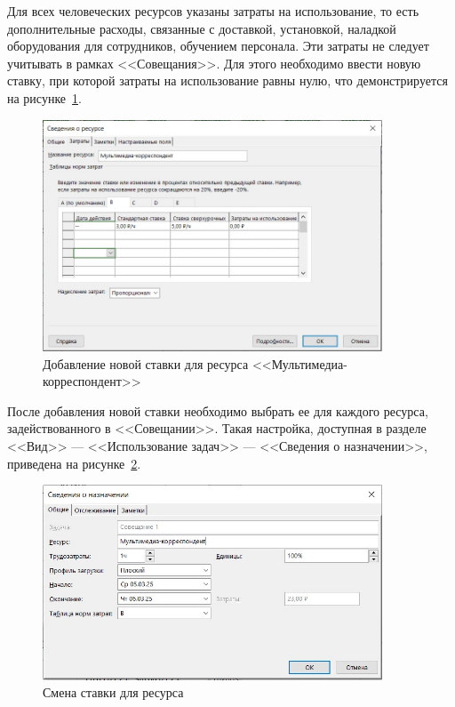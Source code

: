 Для всех человеческих ресурсов указаны затраты на использование, то есть дополнительные расходы, связанные с доставкой, установкой, наладкой оборудования для сотрудников, обучением персонала.
Эти затраты не следует учитывать в рамках <<Совещания>>.
Для этого необходимо ввести новую ставку, при которой затраты на использование равны нулю, что демонстрируется на рисунке~\ref{fig:screen2_3}.

\begin{figure}[H]
	\centering
	\includegraphics[width=0.9\textwidth]{img/task2/screen3.jpg}
	\caption{Добавление новой ставки для ресурса <<Мультимедиа-корреспондент>>}
	\label{fig:screen2_3}
\end{figure}

После добавления новой ставки необходимо выбрать ее для каждого ресурса, задействованного в <<Совещании>>.
Такая настройка, доступная в разделе <<Вид>> --- <<Использование задач>> --- <<Сведения о назначении>>, приведена на рисунке~\ref{fig:screen2_4}.

\begin{figure}[H]
	\centering
	\includegraphics[width=0.9\textwidth]{img/task2/screen4.jpg}
	\caption{Смена ставки для ресурса}
	\label{fig:screen2_4}
\end{figure}

